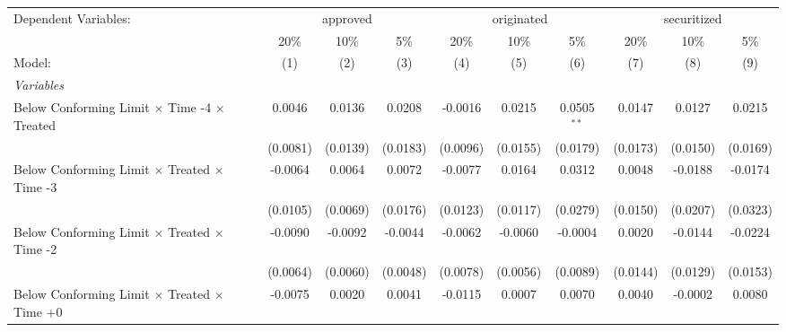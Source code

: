 \begingroup
\centering
\begin{tabular}{lccccccccc}
   \tabularnewline \midrule \midrule
   Dependent Variables: & \multicolumn{3}{c}{approved} & \multicolumn{3}{c}{originated} & \multicolumn{3}{c}{securitized}\\
                                                              & 20\%           & 10\%           & 5\%            & 20\%          & 10\%           & 5\%           & 20\%          & 10\%          & 5\% \\    
   Model:                                                     & (1)            & (2)            & (3)            & (4)           & (5)            & (6)           & (7)           & (8)           & (9)\\  
   \midrule
   \emph{Variables}\\
   Below Conforming Limit $\times$ Time -4 $\times$ Treated   & 0.0046         & 0.0136         & 0.0208         & -0.0016       & 0.0215         & 0.0505$^{**}$ & 0.0147        & 0.0127        & 0.0215\\   
                                                              & (0.0081)       & (0.0139)       & (0.0183)       & (0.0096)      & (0.0155)       & (0.0179)      & (0.0173)      & (0.0150)      & (0.0169)\\   
   Below Conforming Limit $\times$ Treated $\times$ Time -3   & -0.0064        & 0.0064         & 0.0072         & -0.0077       & 0.0164         & 0.0312        & 0.0048        & -0.0188       & -0.0174\\   
                                                              & (0.0105)       & (0.0069)       & (0.0176)       & (0.0123)      & (0.0117)       & (0.0279)      & (0.0150)      & (0.0207)      & (0.0323)\\   
   Below Conforming Limit $\times$ Treated $\times$ Time -2   & -0.0090        & -0.0092        & -0.0044        & -0.0062       & -0.0060        & -0.0004       & 0.0020        & -0.0144       & -0.0224\\   
                                                              & (0.0064)       & (0.0060)       & (0.0048)       & (0.0078)      & (0.0056)       & (0.0089)      & (0.0144)      & (0.0129)      & (0.0153)\\   
   Below Conforming Limit $\times$ Treated $\times$ Time +0   & -0.0075        & 0.0020         & 0.0041         & -0.0115       & 0.0007         & 0.0070        & 0.0040        & -0.0002       & 0.0080\\   

\end{tabular}

